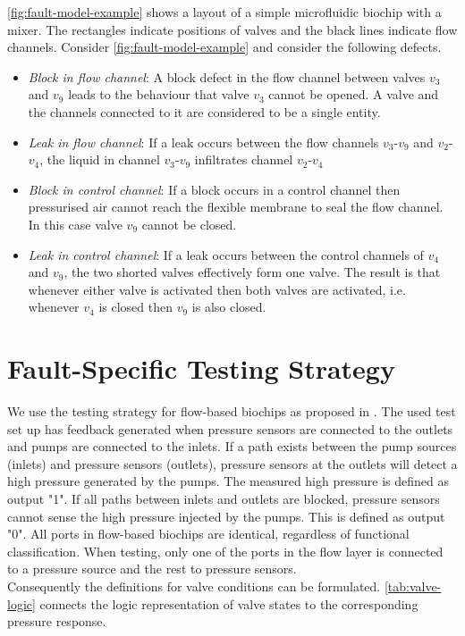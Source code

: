 \autoref{fig:fault-model-example} shows a layout of a simple microfluidic biochip with a mixer. The rectangles indicate positions of valves and the black lines indicate flow channels. Consider \autoref{fig:fault-model-example} and consider the following defects.
\begin{itemize}
\item \emph{Block in flow channel}: A block defect in the flow channel between valves $v_3$ and $v_9$ leads to the behaviour that valve $v_3$ cannot be opened. A valve and the channels connected to it are considered to be a single entity.

\item \emph{Leak in flow channel}: If a leak occurs between the flow channels $v_3$-$v_9$ and $v_2$-$v_4$, the liquid in channel $v_3$-$v_9$ infiltrates channel $v_2$-$v_4$

\item \emph{Block in control channel}: If a block occurs in a control channel then pressurised air cannot reach the flexible membrane to seal the flow channel. In this case valve $v_9$ cannot be closed.

\item \emph{Leak in control channel}: If a leak occurs between the control channels of $v_4$ and $v_9$, the two shorted valves effectively form one valve. The result is that whenever either valve is activated then both valves are activated, i.e. whenever $v_4$ is closed then $v_9$ is also closed.

\end{itemize}

\section{Fault-Specific Testing Strategy}
We use the testing strategy for flow-based biochips as proposed in \cite{fault-modeling}. The used test set up has feedback generated when pressure sensors are connected to the outlets and pumps are connected to the inlets. If a path exists between the pump sources (inlets) and pressure sensors (outlets), pressure sensors at the outlets will detect a high pressure generated by the pumps. The measured high pressure is defined as output "1". If all paths between inlets and outlets are blocked, pressure sensors cannot sense the high pressure injected by the pumps. This is defined as output "0". All ports in flow-based biochips are identical, regardless of functional classification. When testing, only one of the ports in the flow layer is connected to a pressure source and the rest to pressure sensors. \\
Consequently the definitions for valve conditions can be formulated. \autoref{tab:valve-logic} connects the logic representation of valve states to the corresponding pressure response.

